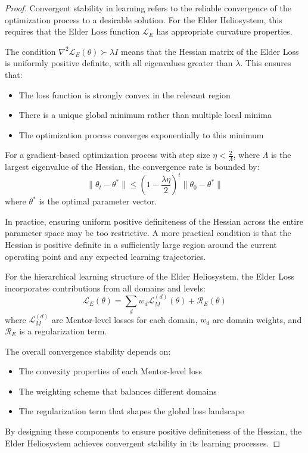 \begin{proof}
Convergent stability in learning refers to the reliable convergence of the optimization process to a desirable solution. For the Elder Heliosystem, this requires that the Elder Loss function $\mathcal{L}_E$ has appropriate curvature properties.

The condition $\nabla^2 \mathcal{L}_E(\theta) \succ \lambda I$ means that the Hessian matrix of the Elder Loss is uniformly positive definite, with all eigenvalues greater than $\lambda$. This ensures that:
\begin{itemize}
    \item The loss function is strongly convex in the relevant region
    \item There is a unique global minimum rather than multiple local minima
    \item The optimization process converges exponentially to this minimum
\end{itemize}

For a gradient-based optimization process with step size $\eta < \frac{2}{\Lambda}$, where $\Lambda$ is the largest eigenvalue of the Hessian, the convergence rate is bounded by:
\begin{equation}
\|\theta_t - \theta^*\| \leq \left(1 - \frac{\lambda \eta}{2}\right)^t \|\theta_0 - \theta^*\|
\end{equation}
where $\theta^*$ is the optimal parameter vector.

In practice, ensuring uniform positive definiteness of the Hessian across the entire parameter space may be too restrictive. A more practical condition is that the Hessian is positive definite in a sufficiently large region around the current operating point and any expected learning trajectories.

For the hierarchical learning structure of the Elder Heliosystem, the Elder Loss incorporates contributions from all domains and levels:
\begin{equation}
\mathcal{L}_E(\theta) = \sum_d w_d \mathcal{L}_M^{(d)}(\theta) + \mathcal{R}_E(\theta)
\end{equation}
where $\mathcal{L}_M^{(d)}$ are Mentor-level losses for each domain, $w_d$ are domain weights, and $\mathcal{R}_E$ is a regularization term.

The overall convergence stability depends on:
\begin{itemize}
    \item The convexity properties of each Mentor-level loss
    \item The weighting scheme that balances different domains
    \item The regularization term that shapes the global loss landscape
\end{itemize}

By designing these components to ensure positive definiteness of the Hessian, the Elder Heliosystem achieves convergent stability in its learning processes.
\end{proof}

